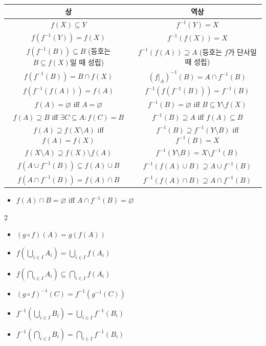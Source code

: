 \documentclass{article}
\begin{document}
\setlength{\tabcolsep}{10pt}
\renewcommand{\arraystretch}{1.5}
\begin{table}[H]
    \centering
    \begin{tabular}{c|c}
        \toprule
        상 & 역상 \\
        \midrule
        $f(X)\subseteq Y$ & $f^{-1}(Y)=X$ \\
        $f(f^{-1}(Y))=f(X)$ & $f^{-1}(f(X))=X$ \\
        $f(f^{-1}(B))\subseteq B$ (등호는 $B\subseteq f(X)$일 때 성립) & $f^{-1}(f(A))\supseteq A$ (등호는 $f$가 단사일 때 성립) \\
        $f(f^{-1}(B))=B\cap f(X)$ & $(f|_A)^{-1}(B)=A\cap f^{-1}(B)$ \\
        $f(f^{-1}(f(A)))=f(A)$ & $f^{-1}(f(f^{-1}(B)))=f^{-1}(B)$ \\
        $f(A)=\varnothing$ iff $A=\varnothing$ & $f^{-1}(B)=\varnothing$ iff $B\subseteq Y\setminus f(X)$ \\
        $f(A)\supseteq B$ iff $\exists C\subseteq A:f(C)=B$ & $f^{-1}(B)\supseteq A$ iff $f(A)\subseteq B$ \\
        $f(A)\supseteq f(X\setminus A)$ iff $f(A)=f(X)$ & $f^{-1}(B)\supseteq f^{-1}(Y\setminus B)$ iff $f^{-1}(B)=X$ \\
        $f(X\setminus A)\supseteq f(X)\setminus f(A)$ & $f^{-1}(Y\setminus B)=X\setminus f^{-1}(B)$ \\
        $f(A\cup f^{-1}(B))\subseteq f(A)\cup B$ & $f^{-1}(f(A)\cup B)\supseteq A\cup f^{-1}(B)$ \\
        $f(A\cap f^{-1}(B))=f(A)\cap B$ & $f^{-1}(f(A)\cap B)\supseteq A\cap f^{-1}(B)$ \\
        \bottomrule
    \end{tabular}
\end{table}
\setlength{\tabcolsep}{6pt}
\renewcommand{\arraystretch}{1}

\begin{itemize}
    \item $f(A)\cap B=\varnothing$ iff $A\cap f^{-1}(B)=\varnothing$
\end{itemize}

\begin{multicols}{2}
    \begin{itemize}
        \item $(g\circ f)(A)=g(f(A))$
        \item $f(\bigcup_{i\in I}A_i)=\bigcup_{i\in I}f(A_i)$
        \item $f(\bigcap_{i\in I}A_i)\subseteq\bigcap_{i\in I}f(A_i)$
        \item $(g\circ f)^{-1}(C)=f^{-1}(g^{-1}(C))$
        \item $f^{-1}(\bigcup_{i\in I}B_i)=\bigcup_{i\in I}f^{-1}(B_i)$
        \item $f^{-1}(\bigcap_{i\in I}B_i)=\bigcap_{i\in I}f^{-1}(B_i)$
    \end{itemize}
\end{multicols}
\end{document}
